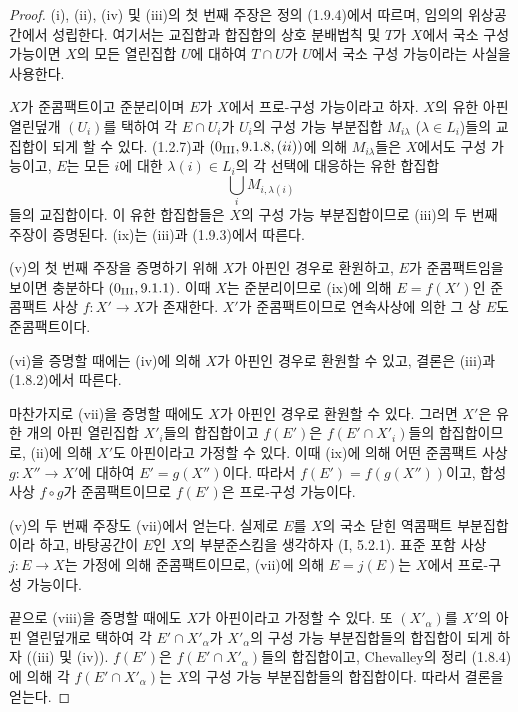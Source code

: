 \begin{proof}
(i), (ii), (iv) 및 (iii)의 첫 번째 주장은 정의 (1.9.4)에서 따르며,
임의의 위상공간에서 성립한다. 여기서는 교집합과 합집합의 상호
분배법칙 및 $T$가 $X$에서 국소 구성 가능이면 $X$의 모든 열린집합
$U$에 대하여 $T\cap U$가 $U$에서 국소 구성 가능이라는 사실을
사용한다.

$X$가 준콤팩트이고 준분리이며 $E$가 $X$에서 프로-구성 가능이라고
하자. $X$의 유한 아핀 열린덮개 $(U_i)$를 택하여 각 $E\cap U_i$가
$U_i$의 구성 가능 부분집합 $M_{i\lambda}$
($\lambda\in L_i$)들의 교집합이 되게 할 수 있다. (1.2.7)과
$(0\textsubscript{III}, 9.1.8, (ii))$에 의해 $M_{i\lambda}$들은
$X$에서도 구성 가능이고, $E$는 모든 $i$에 대한
$\lambda(i)\in L_i$의 각 선택에 대응하는 유한 합집합
\[
  \bigcup_i M_{i,\lambda(i)}
\]
들의 교집합이다. 이 유한 합집합들은 $X$의 구성 가능 부분집합이므로
(iii)의 두 번째 주장이 증명된다. (ix)는 (iii)과 (1.9.3)에서 따른다.

(v)의 첫 번째 주장을 증명하기 위해 $X$가 아핀인 경우로 환원하고,
$E$가 준콤팩트임을 보이면 충분하다 $(0\textsubscript{III}, 9.1.1)$.
이때 $X$는 준분리이므로 (ix)에 의해 $E=f(X')$인 준콤팩트 사상
$f:X'\to X$가 존재한다. $X'$가 준콤팩트이므로 연속사상에 의한 그
상 $E$도 준콤팩트이다.

(vi)을 증명할 때에는 (iv)에 의해 $X$가 아핀인 경우로 환원할 수
있고, 결론은 (iii)과 (1.8.2)에서 따른다.


마찬가지로 (vii)을 증명할 때에도 $X$가 아핀인 경우로 환원할 수
있다. 그러면 $X'$은 유한 개의 아핀 열린집합 $X'_i$들의 합집합이고
$f(E')$은 $f(E'\cap X'_i)$들의 합집합이므로, (ii)에 의해 $X'$도
아핀이라고 가정할 수 있다. 이때 (ix)에 의해 어떤 준콤팩트 사상
$g:X''\to X'$에 대하여 $E'=g(X'')$이다. 따라서
$f(E')=f(g(X''))$이고, 합성사상 $f\circ g$가 준콤팩트이므로 $f(E')$은
프로-구성 가능이다.

(v)의 두 번째 주장도 (vii)에서 얻는다. 실제로 $E$를 $X$의 국소
닫힌 역콤팩트 부분집합이라 하고, 바탕공간이 $E$인 $X$의 부분준스킴을
생각하자 (I, 5.2.1). 표준 포함 사상 $j:E\to X$는 가정에 의해
준콤팩트이므로, (vii)에 의해 $E=j(E)$는 $X$에서 프로-구성 가능이다.

끝으로 (viii)을 증명할 때에도 $X$가 아핀이라고 가정할 수 있다.
또 $(X'_\alpha)$를 $X'$의 아핀 열린덮개로 택하여 각
$E'\cap X'_\alpha$가 $X'_\alpha$의 구성 가능 부분집합들의 합집합이
되게 하자 ((iii) 및 (iv)). $f(E')$은 $f(E'\cap X'_\alpha)$들의
합집합이고, Chevalley의 정리 (1.8.4)에 의해 각
$f(E'\cap X'_\alpha)$는 $X$의 구성 가능 부분집합들의 합집합이다.
따라서 결론을 얻는다.
\end{proof}

